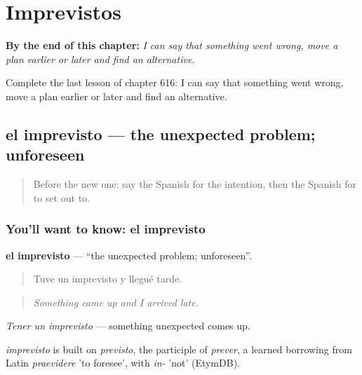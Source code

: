 
\chapter{Imprevistos}
\label{ch:es-imprevistos}

\begin{chapteropening}
\textbf{By the end of this chapter:} \emph{I can say that something went wrong, move a plan earlier or later and find an alternative.}

Complete the last lesson of chapter 616: I can say that something went wrong, move a plan earlier or later and find an alternative.
\end{chapteropening}

\section[el imprevisto]{el imprevisto — the unexpected problem; unforeseen}

\label{lesson:ES-C616-imprevisto}



\begin{quote}
Before the new one: say the Spanish for the intention, then the Spanish for to set out to.
\end{quote}

\subsection*{You'll want to know: el imprevisto}
\textbf{el imprevisto} — \textquotedblleft{}the unexpected problem; unforeseen\textquotedblright{}.

\begin{quote}
Tuve un imprevisto y llegué tarde.
\end{quote}

\begin{quote}
\emph{Something came up and I arrived late.}
\end{quote}

\emph{Tener un imprevisto} — something unexpected comes up.

\begin{cousinweb}
\emph{imprevisto} is built on \emph{previsto}, the participle of \emph{prever}, a learned borrowing from Latin \emph{praevidere} 'to foresee', with \emph{in-} 'not' (EtymDB).
\end{cousinweb}


